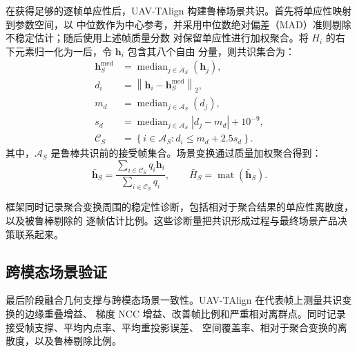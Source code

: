 在获得足够的逐帧单应性后，UAV-TAlign 构建鲁棒场景共识。首先将单应性映射到参数空间，以
中位数作为中心参考，并采用中位数绝对偏差（MAD）准则剔除不稳定估计；随后使用上述帧质量分数
对保留单应性进行加权聚合。将 $H_i$ 的右下元素归一化为一后，令 $\mathbf{h}_i$ 包含其八个自由
分量，则共识集合为：
\begin{equation}
\begin{aligned}
\mathbf{h}^{\mathrm{med}}_S
&= \operatorname{median}_{j \in \mathcal{A}_S}(\mathbf{h}_j), \\
d_i &= \left\|\mathbf{h}_i - \mathbf{h}^{\mathrm{med}}_S\right\|_2, \\
m_d &= \operatorname{median}_{j \in \mathcal{A}_S}(d_j), \\
s_d &= \operatorname{median}_{j \in \mathcal{A}_S}|d_j-m_d| + 10^{-9}, \\
\mathcal{C}_S &= \left\{i \in \mathcal{A}_S: d_i \le m_d + 2.5s_d\right\}.
\end{aligned}
\label{eq:consensus_set_zh}
\end{equation}
其中，$\mathcal{A}_S$ 是鲁棒共识前的接受帧集合。场景变换通过质量加权聚合得到：
\begin{equation}
\bar{\mathbf{h}}_S =
\frac{\sum_{i \in \mathcal{C}_S} q_i \mathbf{h}_i}
{\sum_{i \in \mathcal{C}_S} q_i},
\qquad
\bar{H}_S = \operatorname{mat}(\bar{\mathbf{h}}_S).
\label{eq:scene_consensus_zh}
\end{equation}

框架同时记录聚合变换周围的稳定性诊断，包括相对于聚合结果的单应性离散度，以及被鲁棒剔除的
逐帧估计比例。这些诊断量把共识形成过程与最终场景产品决策联系起来。

\subsection{跨模态场景验证}

最后阶段融合几何支撑与跨模态场景一致性。UAV-TAlign 在代表帧上测量共识变换的边缘重叠增益、
梯度 NCC 增益、改善帧比例和严重相对离群点。同时记录接受帧支撑、平均内点率、平均重投影误差、
空间覆盖率、相对于聚合变换的离散度，以及鲁棒剔除比例。


